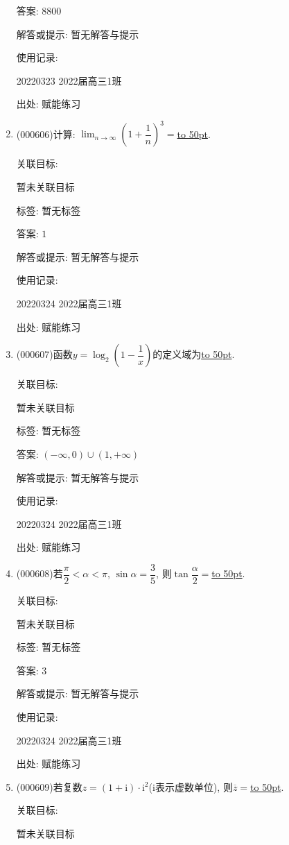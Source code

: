 \documentclass[10pt,a4paper]{article}
\newcommand{\blank}[1]{\underline{\hbox to #1pt{}}}
\begin{document}
\begin{enumerate}[1.]
答案: $8800$

解答或提示: 暂无解答与提示

使用记录:

20220323	2022届高三1班	


出处: 赋能练习
\item { (000606)}计算: $\displaystyle\lim_{n\to\infty}(1+\dfrac1n)^3=$\blank{50}.


关联目标:

暂未关联目标



标签: 暂无标签

答案: $1$

解答或提示: 暂无解答与提示

使用记录:

20220324	2022届高三1班	


出处: 赋能练习
\item { (000607)}函数$y=\log_2(1-\dfrac1x)$的定义域为\blank{50}.


关联目标:

暂未关联目标



标签: 暂无标签

答案: $(-\infty ,0)\cup (1,+\infty)$

解答或提示: 暂无解答与提示

使用记录:

20220324	2022届高三1班	


出处: 赋能练习
\item { (000608)}若$\dfrac{\pi}2<\alpha<\pi$, $\sin\alpha=\dfrac35$, 则$\tan\dfrac{\alpha}2=$\blank{50}.


关联目标:

暂未关联目标



标签: 暂无标签

答案: $3$

解答或提示: 暂无解答与提示

使用记录:

20220324	2022届高三1班	


出处: 赋能练习
\item { (000609)}若复数$z=(1+\mathrm{i})\cdot \mathrm{i}^2$($\mathrm{i}$表示虚数单位), 则$\overline z=$\blank{50}.


关联目标:

暂未关联目标




\end{enumerate}
\end{document}
